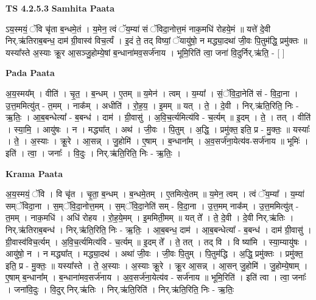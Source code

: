 \documentclass[17pt]{extarticle}
\begin{document}
\textbf{TS 4.2.5.3 } \newline
\textbf{Samhita Paata} \newline

ऽय॒स्मयं॒ ॅवि चृ॑ता ब॒न्धमे॒तं । य॒मेन॒ त्वं ॅय॒म्या॑ सं ॅविदा॒नोत्त॒मं नाक॒मधि॑ रोहये॒मं ॥ यत्ते॑ दे॒वी निर्.ऋ॑तिराब॒बन्ध॒ दाम॑ ग्री॒वास्व॑ विच॒र्त्यं । इ॒दं ते॒ तद् विष्यां॒ ॅयायु॑षो॒ न मद्ध्या॒दथा॑ जी॒वः पि॒तुम॑द्धि॒ प्रमु॑क्तः ॥ यस्या᳚स्ते अ॒स्याः क्रू॒र आ॒सञ्जु॒होम्ये॒षां ब॒न्धाना॑मव॒सर्ज॑नाय । भूमि॒रिति॑ त्वा॒ जना॑ वि॒दुर्निर्.ऋ॑ति॒ - [  ] \newline

\textbf{Pada Paata} \newline

अ॒य॒स्मय᳚म् । वीति॑ । चृ॒त॒ । ब॒न्धम् । ए॒तम् ॥ य॒मेन॑ । त्वम् । य॒म्या᳚ । सं॒ॅवि॒दा॒नेति॑ सं - वि॒दा॒ना । उ॒त्त॒ममित्यु॑त् - त॒मम् । नाक᳚म् । अधीति॑ । रो॒ह॒य॒ । इ॒मम् ॥ यत् । ते॒ । दे॒वी । निर्.ऋ॑ति॒रिति॒ निः - ऋ॒तिः॒ । आ॒ब॒बन्धेत्या᳚ - ब॒बन्ध॑ । दाम॑ । ग्री॒वासु॑ । अ॒वि॒च॒र्त्यमित्य॑वि - च॒र्त्यम् ॥ इ॒दम् । ते॒ । तत् । वीति॑ । स्या॒मि॒ । आयु॑षः । न । मद्ध्या᳚त् । अथ॑ । जी॒वः । पि॒तुम् । अ॒द्धि॒ । प्रमु॑क्त॒ इति॒ प्र - मु॒क्तः॒ ॥ यस्याः᳚ । ते॒ । अ॒स्याः । क्रू॒रे । आ॒सन्न् । जु॒होमि॑ । ए॒षाम् । ब॒न्धाना᳚म् । अ॒व॒सर्ज॑ना॒येत्य॑व-सर्ज॑नाय ॥ भूमिः॑ । इति॑ । त्वा॒ । जनाः᳚ । वि॒दुः । निर्.ऋ॑ति॒रिति॒ निः - ऋ॒तिः॒ ।  \newline


\textbf{Krama Paata} \newline

अ॒य॒स्मयं॒ ॅवि । वि चृ॑त । चृ॒ता॒ ब॒न्धम् । ब॒न्धमे॒तम् । ए॒तमित्ये॒तम् ॥ य॒मेन॒ त्वम् । त्वं ॅय॒म्या᳚ । य॒म्या॑ सम्ॅविदा॒ना । स॒म्ॅवि॒दा॒नोत्त॒मम् । स॒म्ॅवि॒दा॒नेति॑ सम् - वि॒दा॒ना । उ॒त्त॒मम् नाक᳚म् । उ॒त्त॒ममित्यु॑त् - त॒मम् । नाक॒मधि॑ । अधि॑ रोहय । रो॒ह॒ये॒मम् । इ॒ममिती॒मम् ॥ यत् ते᳚ । ते॒ दे॒वी । दे॒वी निर्.ऋ॑तिः । निर्.ऋ॑तिराब॒बन्ध॑ । निर्.ऋ॑ति॒रिति॒ निः - ऋ॒तिः॒ । आ॒ब॒बन्ध॒ दाम॑ । आ॒ब॒बन्धेत्या᳚ - ब॒बन्ध॑ । दाम॑ ग्री॒वासु॑ । ग्री॒वास्व॑विच॒र्त्यम् । अ॒वि॒च॒र्त्यमित्य॑वि - च॒र्त्यम् ॥ इ॒दम् ते᳚ । ते॒ तत् । तद् वि । वि ष्या॑मि । स्या॒म्यायु॑षः । आयु॑षो॒ न । न मद्ध्या᳚त् । मद्ध्या॒दथ॑ । अथा॑ जी॒वः । जी॒वः पि॒तुम् । पि॒तुम॑द्धि । अ॒द्धि॒ प्रमु॑क्तः । प्रमु॑क्त॒ इति॒ प्र - मु॒क्तः॒ ॥ यस्या᳚स्ते । ते॒ अ॒स्याः । अ॒स्याः क्रू॒रे । क्रू॒र आ॒सन्न् । आ॒सन् जु॒होमि॑ । जु॒होम्ये॒षाम् । ए॒षाम् ब॒न्धाना᳚म् । ब॒न्धाना॑मव॒सर्ज॑नाय । अ॒व॒सर्ज॑ना॒येत्य॑व - सर्ज॑नाय ॥ भूमि॒रिति॑ । इति॑ त्वा । त्वा॒ जनाः᳚ । जना॑वि॒दुः । वि॒दुर् निर्.ऋ॑तिः । निर्.ऋ॑ति॒रिति॑ । निर्.ऋ॑ति॒रिति॒ निः - ऋ॒तिः॒ \newline
\end{document}
